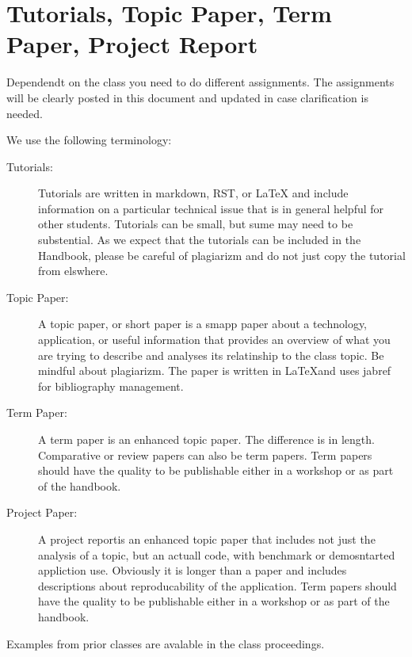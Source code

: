 
\section{Tutorials, Topic Paper, Term Paper, Project Report}

\FILENAME

Dependendt on the class you need to do different assignments. The
assignments will be clearly posted in this document and updated in
case clarification is needed. 

We use the following terminology:

\begin{description}

\item[Tutorials:] Tutorials are written in markdown, RST, or LaTeX and
  include information on a particular technical issue that is in
  general helpful for other students. Tutorials can be small, but sume
  may need to be substential. As we expect that the tutorials can be
  included in the Handbook, please be careful of plagiarizm and do not
  just copy the tutorial from elswhere. 

\item[Topic Paper:] A topic paper, or short paper is a smapp paper
  about a technology, application, or useful information that provides
  an overview of what you are trying to describe and analyses its
  relatinship to the class topic. Be mindful about plagiarizm. The
  paper is written in \LaTeX and uses jabref for bibliography management. 

\item[Term Paper:] A term paper is an enhanced topic paper. The
  difference is in length. Comparative or review papers can also be
  term papers.  Term papers should have the quality to be publishable
  either in a workshop or as part of the handbook.

\item[Project Paper:] A project reportis an enhanced topic paper that
  includes not just the analysis of a topic, but an actuall code, with
  benchmark or demosntarted appliction use. Obviously it is longer
  than a paper and includes descriptions about reproducability of the
  application. Term papers should have the quality to be publishable
  either in a workshop or as part of the handbook.

\end{description}

Examples from prior classes are avalable in the class proceedings.

